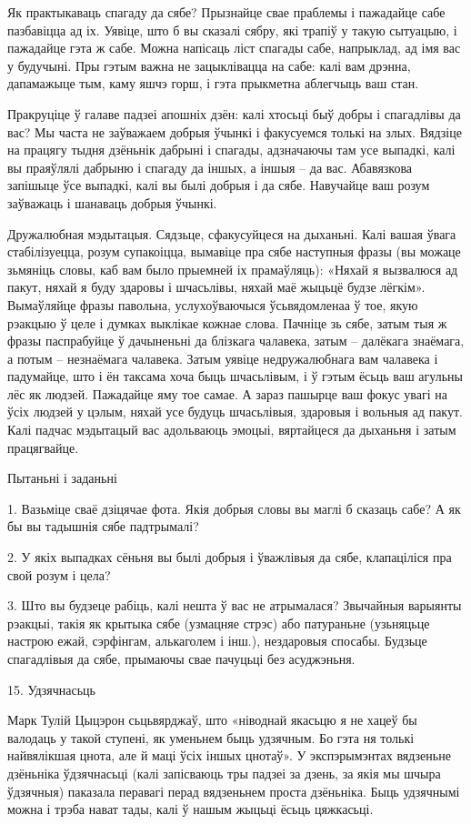 Як практыкаваць спагаду да сябе? Прызнайце свае праблемы і пажадайце сабе пазбавіцца ад іх. Уявіце, што б вы сказалі сябру, які трапіў у такую сытуацыю, і пажадайце гэта ж сабе. Можна напісаць ліст спагады сабе, напрыклад, ад імя вас у будучыні. Пры гэтым важна не зацыклівацца на сабе: калі вам дрэнна, дапамажыце тым, каму яшчэ горш, і гэта прыкметна аблегчыць ваш стан.

Пракруціце ў галаве падзеі апошніх дзён: калі хтосьці быў добры і спагадлівы да вас? Мы часта не заўважаем добрыя ўчынкі і факусуемся толькі на злых. Вядзіце на працягу тыдня дзёньнік дабрыні і спагады, адзначаючы там усе выпадкі, калі вы праяўлялі дабрыню і спагаду да іншых, а іншыя – да вас. Абавязкова запішыце ўсе выпадкі, калі вы былі добрыя і да сябе. Навучайце ваш розум заўважаць і шанаваць добрыя ўчынкі.

Дружалюбная мэдытацыя. Сядзьце, сфакусуйцеся на дыханьні. Калі вашая ўвага стабілізуецца, розум супакоіцца, вымавіце пра сябе наступныя фразы (вы можаце зьмяніць словы, каб вам было прыемней іх прамаўляць): «Няхай я вызвалюся ад пакут, няхай я буду здаровы і шчасьлівы, няхай маё жыцьцё будзе лёгкім». Вымаўляйце фразы павольна, услухоўваючыся ўсьвядомленаа ў тое, якую рэакцыю ў целе і думках выклікае кожнае слова. Пачніце зь сябе, затым тыя ж фразы паспрабуйце ў дачыненьні да блізкага чалавека, затым – далёкага знаёмага, а потым – незнаёмага чалавека. Затым уявіце недружалюбнага вам чалавека і падумайце, што і ён таксама хоча быць шчасьлівым, і ў гэтым ёсьць ваш агульны лёс як людзей. Пажадайце яму тое самае. А зараз пашырце ваш фокус увагі на ўсіх людзей у цэлым, няхай усе будуць шчасьлівыя, здаровыя і вольныя ад пакут. Калі падчас мэдытацый вас адольваюць эмоцыі, вяртайцеся да дыханьня і затым працягвайце.

Пытаньні і заданьні

1. Вазьміце сваё дзіцячае фота. Якія добрыя словы вы маглі б сказаць сабе? А як бы вы тадышнія сябе падтрымалі?

2. У якіх выпадках сёньня вы былі добрыя і ўважлівыя да сябе, клапаціліся пра свой розум і цела?

3. Што вы будзеце рабіць, калі нешта ў вас не атрымалася? Звычайныя варыянты рэакцыі, такія як крытыка сябе (узмацняе стрэс) або патураньне (узьняцьце настрою ежай, сэрфінгам, алькаголем і інш.), нездаровыя спосабы. Будзьце спагадлівыя да сябе, прымаючы свае пачуцьці без асуджэньня.


15. Удзячнасьць

Марк Тулій Цыцэрон сьцьвярджаў, што «ніводнай якасьцю я не хацеў бы валодаць у такой ступені, як уменьнем быць удзячным. Бо гэта ня толькі найвялікшая цнота, але й маці ўсіх іншых цнотаў». У экспэрымэнтах вядзеньне дзёньніка ўдзячнасьці (калі запісваюць тры падзеі за дзень, за якія мы шчыра ўдзячныя) паказала перавагі перад вядзеньнем проста дзёньніка. Быць удзячнымі можна і трэба нават тады, калі ў нашым жыцьці ёсьць цяжкасьці.

